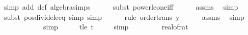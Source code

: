 \begin{isabellebody}
\ {\isacharparenleft}{\kern0pt}simp\ add{\isacharcolon}{\kern0pt}\ {\isasymdelta}{\isacharprime}{\kern0pt}{\isacharunderscore}{\kern0pt}def\ algebra{\isacharunderscore}{\kern0pt}simps{\isacharparenright}{\kern0pt}\isanewline
\ \ \ \ \isamarkupfalse%
\ {\isacharparenleft}{\kern0pt}subst\ power{\isacharunderscore}{\kern0pt}le{\isacharunderscore}{\kern0pt}one{\isacharunderscore}{\kern0pt}iff{\isacharparenright}{\kern0pt}\isanewline
\ \ \ \ \isamarkupfalse%
\ assms\ \isamarkupfalse%
\ simp\isanewline
\ \ \ \ \isamarkupfalse%
\ {\isacharparenleft}{\kern0pt}subst\ pos{\isacharunderscore}{\kern0pt}divide{\isacharunderscore}{\kern0pt}le{\isacharunderscore}{\kern0pt}eq{\isacharcomma}{\kern0pt}\ simp{\isacharcomma}{\kern0pt}\ simp{\isacharparenright}{\kern0pt}\isanewline
\ \ \ \ \isamarkupfalse%
\ {\isacharparenleft}{\kern0pt}rule\ order{\isacharunderscore}{\kern0pt}trans{\isacharbrackleft}{\kern0pt}\ y{\isacharequal}{\kern0pt}{\isachardoublequoteopen}{}{\isachardoublequoteclose}{\isacharbrackright}{\kern0pt}{\isacharparenright}{\kern0pt}\isanewline
\ \ \ \ \isamarkupfalse%
\ assms{\isacharparenleft}{\kern0pt}{}{\isacharparenright}{\kern0pt}\ \isamarkupfalse%
\ simp{\isacharplus}{\kern0pt}\isanewline
\ \ \isamarkupfalse%
\ \isamarkupfalse%
\ {\isachardoublequoteopen}{\isachardot}{\kern0pt}{\isachardot}{\kern0pt}{\isachardot}{\kern0pt}\ {\isacharequal}{\kern0pt}\ {}{}{\isacharslash}{\kern0pt}\ {\isasymdelta}{\isacharprime}{\kern0pt}\isanewline
\ \ \ \ \isamarkupfalse%
\ simp\isanewline
\ \ \isamarkupfalse%
\ \isamarkupfalse%
\ t{\isacharunderscore}{\kern0pt}le{\isacharunderscore}{\kern0pt}{\isasymdelta}{\isacharprime}{\kern0pt}{\isacharcolon}{\kern0pt}\ {\isachardoublequoteopen}t\ {\isasymle}\ {}{}{\isacharslash}{\kern0pt}\ {\isasymdelta}{\isacharprime}{\kern0pt}\ \isamarkupfalse%
\ simp\isanewline
\isanewline
\ \ \isamarkupfalse%
\ {\isachardoublequoteopen}{}{}\ {\isacharslash}{\kern0pt}\ {\isasymdelta}{\isacharprime}{\kern0pt}\ {\isacharequal}{\kern0pt}\ {}{}{\isacharslash}{\kern0pt}\ {\isacharparenleft}{\kern0pt}real{\isacharunderscore}{\kern0pt}of{\isacharunderscore}{\kern0pt}rat\ {\isasymdelta}{\isacharparenright}{\kern0pt}\isanewline

\end{isabellebody}
